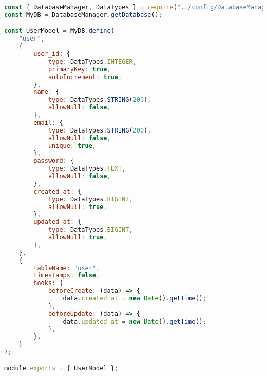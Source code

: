 \begin{lstlisting}[language=Javascript,caption={User Model}]
const { DatabaseManager, DataTypes } = require("../config/DatabaseManager.js");
const MyDB = DatabaseManager.getDatabase();

const UserModel = MyDB.define(
	"user",
	{
		user_id: {
			type: DataTypes.INTEGER,
			primaryKey: true,
			autoIncrement: true,
		},
		name: {
			type: DataTypes.STRING(200),
			allowNull: false,
		},
		email: {
			type: DataTypes.STRING(200),
			allowNull: false,
			unique: true,
		},
		password: {
			type: DataTypes.TEXT,
			allowNull: false,
		},
		created_at: {
			type: DataTypes.BIGINT,
			allowNull: true,
		},
		updated_at: {
			type: DataTypes.BIGINT,
			allowNull: true,
		},
	},
	{
		tableName: "user",
		timestamps: false,
		hooks: {
			beforeCreate: (data) => {
				data.created_at = new Date().getTime();
			},
			beforeUpdate: (data) => {
				data.updated_at = new Date().getTime();
			},
		},
	}
);

module.exports = { UserModel };
\end{lstlisting}
